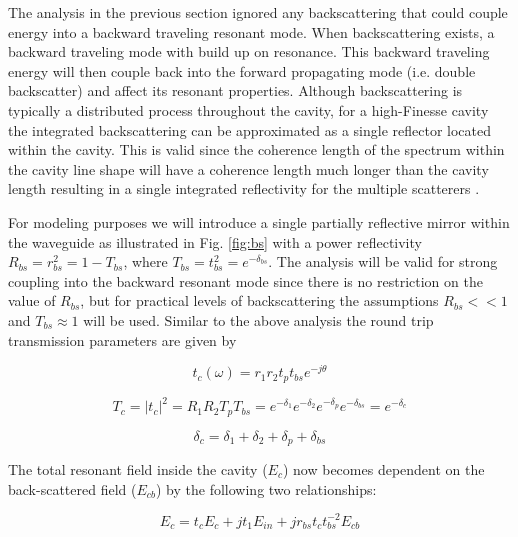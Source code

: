 \documentclass[10pt]{article}
\begin{document}
The analysis in the previous section ignored any backscattering that could couple energy into a backward traveling resonant mode.  When backscattering exists, a backward traveling mode with build up on resonance.  This backward traveling energy will then couple back into the forward propagating mode (i.e. double backscatter) and affect its resonant properties.  Although backscattering is typically a distributed process throughout the cavity, for a high-Finesse cavity the integrated backscattering can be approximated as a single reflector located within the cavity. This is valid since the coherence length of the spectrum within the cavity line shape will have a coherence length much longer than the cavity length resulting in a single integrated reflectivity for the multiple scatterers .

For modeling purposes we will introduce a single partially reflective mirror within the waveguide as illustrated in Fig. \ref{fig:bs} with a power reflectivity $R_{bs}  = r_{bs}^2 = 1-T_{bs}$, where $T_{bs} = t_{bs}^2 = e^{-\delta_{bs}} $.   The analysis will be valid for strong coupling into the backward resonant mode since there is no restriction on the value of $R_{bs}$, but for practical levels of backscattering the assumptions $R_{bs} << 1$ and $T_{bs} \approx 1$ will be used.   Similar to the above analysis the round trip transmission parameters are given by
  
\begin{equation} t_{c}(\omega) = r_1 r_2 t_p t_{bs} e^{-j\theta} \end{equation} 

\begin{equation} 
T_c = |t_c|^2 = R_1 R_2 T_p T_{bs} = e^{-\delta_1} e^{-\delta_2} e^{-\delta_p} e^{-\delta_{bs}} = e^{-\delta_c}  \end{equation}


\begin{equation} 
\delta_c = \delta_1 + \delta_2 + \delta_p + \delta_{bs} \end{equation}  



The total resonant field inside the cavity ($E_c$) now becomes dependent on the back-scattered field ($E_{cb}$) by the following two relationships:

\begin{equation} 
E_c = t_c E_c + jt_1E_{in} + jr_{bs} t_c t_{bs}^{-2} E_{cb} 
\end{equation}  
\end{document}
